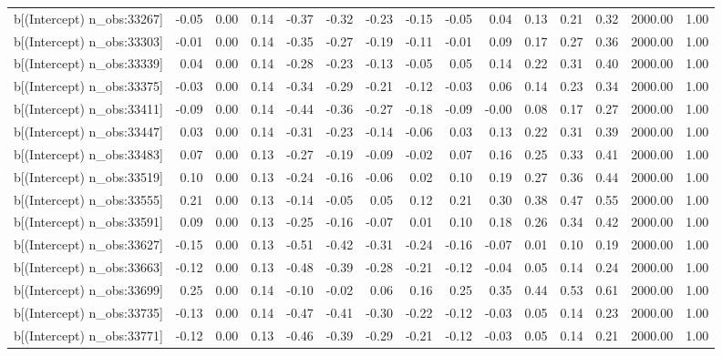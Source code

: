 \begin{table}[ht]
\begin{tabular}{rrrrrrrrrrrrrrr}
  b[(Intercept) n\_obs:33267] & -0.05 & 0.00 & 0.14 & -0.37 & -0.32 & -0.23 & -0.15 & -0.05 & 0.04 & 0.13 & 0.21 & 0.32 & 2000.00 & 1.00 \\ 
  b[(Intercept) n\_obs:33303] & -0.01 & 0.00 & 0.14 & -0.35 & -0.27 & -0.19 & -0.11 & -0.01 & 0.09 & 0.17 & 0.27 & 0.36 & 2000.00 & 1.00 \\ 
  b[(Intercept) n\_obs:33339] & 0.04 & 0.00 & 0.14 & -0.28 & -0.23 & -0.13 & -0.05 & 0.05 & 0.14 & 0.22 & 0.31 & 0.40 & 2000.00 & 1.00 \\ 
  b[(Intercept) n\_obs:33375] & -0.03 & 0.00 & 0.14 & -0.34 & -0.29 & -0.21 & -0.12 & -0.03 & 0.06 & 0.14 & 0.23 & 0.34 & 2000.00 & 1.00 \\ 
  b[(Intercept) n\_obs:33411] & -0.09 & 0.00 & 0.14 & -0.44 & -0.36 & -0.27 & -0.18 & -0.09 & -0.00 & 0.08 & 0.17 & 0.27 & 2000.00 & 1.00 \\ 
  b[(Intercept) n\_obs:33447] & 0.03 & 0.00 & 0.14 & -0.31 & -0.23 & -0.14 & -0.06 & 0.03 & 0.13 & 0.22 & 0.31 & 0.39 & 2000.00 & 1.00 \\ 
  b[(Intercept) n\_obs:33483] & 0.07 & 0.00 & 0.13 & -0.27 & -0.19 & -0.09 & -0.02 & 0.07 & 0.16 & 0.25 & 0.33 & 0.41 & 2000.00 & 1.00 \\ 
  b[(Intercept) n\_obs:33519] & 0.10 & 0.00 & 0.13 & -0.24 & -0.16 & -0.06 & 0.02 & 0.10 & 0.19 & 0.27 & 0.36 & 0.44 & 2000.00 & 1.00 \\ 
  b[(Intercept) n\_obs:33555] & 0.21 & 0.00 & 0.13 & -0.14 & -0.05 & 0.05 & 0.12 & 0.21 & 0.30 & 0.38 & 0.47 & 0.55 & 2000.00 & 1.00 \\ 
  b[(Intercept) n\_obs:33591] & 0.09 & 0.00 & 0.13 & -0.25 & -0.16 & -0.07 & 0.01 & 0.10 & 0.18 & 0.26 & 0.34 & 0.42 & 2000.00 & 1.00 \\ 
  b[(Intercept) n\_obs:33627] & -0.15 & 0.00 & 0.13 & -0.51 & -0.42 & -0.31 & -0.24 & -0.16 & -0.07 & 0.01 & 0.10 & 0.19 & 2000.00 & 1.00 \\ 
  b[(Intercept) n\_obs:33663] & -0.12 & 0.00 & 0.13 & -0.48 & -0.39 & -0.28 & -0.21 & -0.12 & -0.04 & 0.05 & 0.14 & 0.24 & 2000.00 & 1.00 \\ 
  b[(Intercept) n\_obs:33699] & 0.25 & 0.00 & 0.14 & -0.10 & -0.02 & 0.06 & 0.16 & 0.25 & 0.35 & 0.44 & 0.53 & 0.61 & 2000.00 & 1.00 \\ 
  b[(Intercept) n\_obs:33735] & -0.13 & 0.00 & 0.14 & -0.47 & -0.41 & -0.30 & -0.22 & -0.12 & -0.03 & 0.05 & 0.14 & 0.23 & 2000.00 & 1.00 \\ 
  b[(Intercept) n\_obs:33771] & -0.12 & 0.00 & 0.13 & -0.46 & -0.39 & -0.29 & -0.21 & -0.12 & -0.03 & 0.05 & 0.14 & 0.21 & 2000.00 & 1.00 \\ 

\end{tabular}
\end{table}
